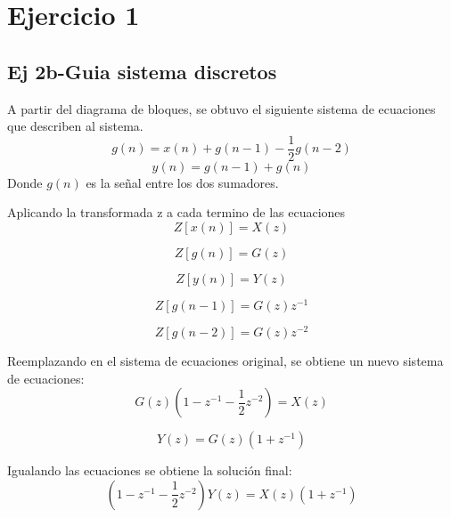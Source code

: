 \documentclass[../../guia1.tex]{subfiles}
\begin{document}
\section*{Ejercicio 1}

\subsection*{Ej 2b-Guia sistema discretos}
A partir del diagrama de bloques, se obtuvo el siguiente sistema de ecuaciones que describen al sistema.
\begin{equation}
g(n)=x(n) + g(n-1) - \frac{1}{2} g(n-2) \label{eq:2b1}
\end{equation}
\begin{equation}
y(n)=g(n-1)+g(n) \label{eq:2b2}
\end{equation}
Donde $g(n)$ es la se\~nal entre los dos sumadores.

Aplicando la transformada z a cada termino de las ecuaciones
\begin{equation}
Z[x(n)]=X(z)
\end{equation}

\begin{equation}
Z[g(n)]=G(z)
\end{equation}

\begin{equation}
Z[y(n)]=Y(z)
\end{equation}

\begin{equation}
Z[g(n-1)]=G(z) z^{-1}
\end{equation}

\begin{equation}
Z[g(n-2)]=G(z) z^{-2}
\end{equation}

Reemplazando en el sistema de ecuaciones original, se obtiene un nuevo sistema de ecuaciones:
\begin{equation}
G(z)\left( 1- z^{-1} - \frac{1}{2} z^{-2} \right)=X(z)
\end{equation}

\begin{equation}
Y(z)=G(z)\left( 1+ z^{-1}\right)
\end{equation}

Igualando las ecuaciones se obtiene la solución final:
\begin{equation}
\left( 1- z^{-1} - \frac{1}{2} z^{-2} \right) Y(z) = X(z)\left( 1+ z^{-1}\right)
\end{equation}
\end{document}
